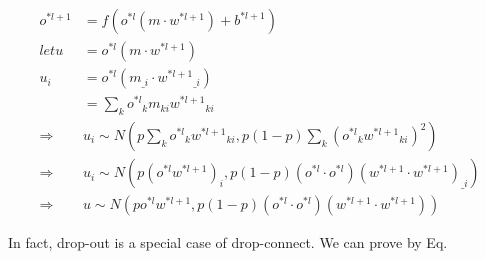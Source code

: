 \documentclass[runningheads,openany]{xhlPaper}
\begin{document}
\begin{equation}
\label{equ:bp_dropconnect_sampling_approximation}
\begin{aligned}
{o^{*l + 1}} &= f\left( {{o^{*l}}\left( {m \cdot {w^{*l + 1}}} \right) + {b^{*l + 1}}} \right)\\
let u &= {o^{*l}}\left( {m \cdot {w^{*l + 1}}} \right)\\
{u_i} &= {o^{*l}}\left( {{m_{\_i}} \cdot {w^{*l + 1}}_{\_i}} \right)\\
 &= \sum\limits_k {{o^{*l}}_k{m_{ki}}{w^{*l + 1}}_{ki}} \\
 \Rightarrow& {u_i} \sim N\left( {p\sum\limits_k {{o^{*l}}_k{w^{*l + 1}}_{ki}} ,p\left( {1 - p} \right)\sum\limits_k {{{\left( {{o^{*l}}_k{w^{*l + 1}}_{ki}} \right)}^2}} } \right)\\
 \Rightarrow& {u_i} \sim N\left( {p{{\left( {{o^{*l}}{w^{*l + 1}}} \right)}_i},p\left( {1 - p} \right)\left( {{o^{*l}} \cdot {o^{*l}}} \right){{\left( {{w^{*l + 1}} \cdot {w^{*l + 1}}} \right)}_{\_i}}} \right)\\
 \Rightarrow& u \sim N\left( {p{o^{*l}}{w^{*l + 1}},p\left( {1 - p} \right)\left( {{o^{*l}} \cdot {o^{*l}}} \right)\left( {{w^{*l + 1}} \cdot {w^{*l + 1}}} \right)} \right)
\end{aligned}
\end{equation}

In fact, drop-out is a special case of drop-connect. We can prove by Eq.~
\end{document}
